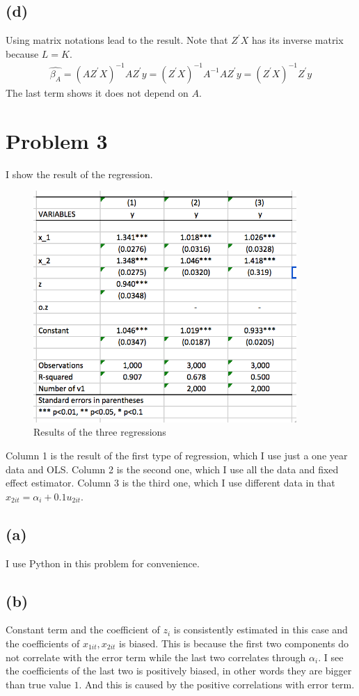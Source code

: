 \documentclass{article}
\begin{document}
\subsection{(d)}
Using matrix notations lead to the result. Note that $Z^{'}X$ has its inverse matrix because $L = K$.
\begin{align*}
	\hat{\beta_A} = (AZ^{'}X)^{-1}AZ^{'}y = (Z^{'}X)^{-1}A^{-1}AZ^{'}y = (Z^{'}X)^{-1}Z^{'}y
\end{align*}
The last term shows it does not depend on $A$.

\section{Problem 3}
I show the result of the regression.
\begin{figure}[h]
    \centering
    \includegraphics[width=10cm]{3.png}
    \caption{Results of the three regressions}
\end{figure}
Column 1 is the result of the first type of regression, which I use just a one year data and OLS. Column 2 is the second one, which I use all the data and fixed effect estimator. Column 3 is the third one, which I use different data in that $x_{2it} = \alpha_i + 0.1u_{2it}$.
\subsection{(a)}
I use Python in this problem for convenience.

\subsection{(b)}
Constant term and the coefficient of $z_i$ is consistently estimated in this case and the coefficients of $x_{1it}, x_{2it}$ is biased. This is because the first two components do not correlate with the error term while the last two correlates through $\alpha_i$. I see the coefficients of the last two is positively biased, in other words they are bigger than true value $1$. And this is caused by the positive correlations with error term.
\end{document}
